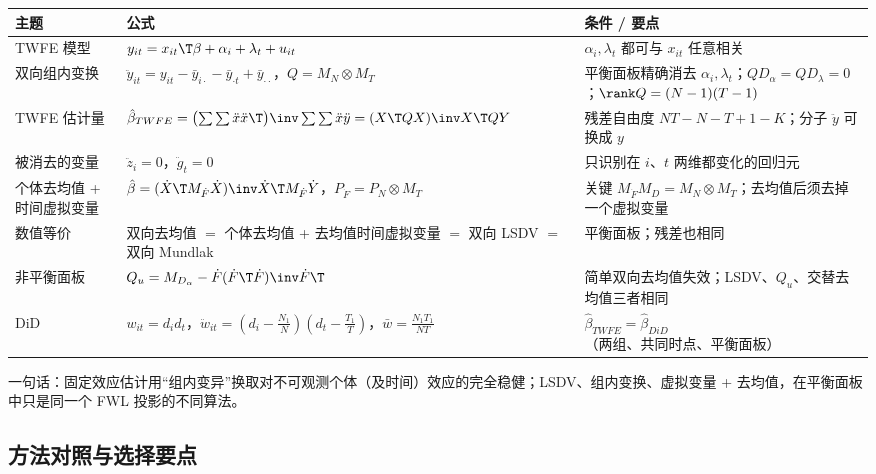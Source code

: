 \begin{center}
\small
\begin{tabularx}{\linewidth}{@{}p{2.3cm}LL@{}}
\toprule
主题 & 公式 & 条件 / 要点\\
\midrule
TWFE 模型 & $y_{it}=x_{it}\T\beta+\alpha_i+\lambda_t+u_{it}$ & $\alpha_i,\lambda_t$ 都可与 $x_{it}$ 任意相关\\
双向组内变换 & $\ddot y_{it}=y_{it}-\bar y_{i\cdot}-\bar y_{\cdot t}+\bar y_{\cdot\cdot}$，$Q=M_N\otimes M_T$ & 平衡面板精确消去 $\alpha_i,\lambda_t$；$QD_\alpha=QD_\lambda=0$；$\rank Q=(N-1)(T-1)$\\
TWFE 估计量 & $\hat\beta_{TWFE}=\bigl(\sum\sum\ddot x\ddot x\T\bigr)\inv\sum\sum\ddot x\ddot y=(X\T QX)\inv X\T QY$ & 残差自由度 $NT-N-T+1-K$；分子 $\ddot y$ 可换成 $y$\\
被消去的变量 & $\ddot z_i=0$，$\ddot g_t=0$ & 只识别在 $i$、$t$ 两维都变化的回归元\\
个体去均值 + 时间虚拟变量 & $\hat\beta=(\dot X\T M_{\dot F}\dot X)\inv\dot X\T M_{\dot F}\dot Y$，$P_{\dot F}=P_N\otimes M_T$ & 关键 $M_{\dot F}M_D=M_N\otimes M_T$；去均值后须去掉一个虚拟变量\\
数值等价 & 双向去均值 $=$ 个体去均值 + 去均值时间虚拟变量 $=$ 双向 LSDV $=$ 双向 Mundlak & 平衡面板；残差也相同\\
非平衡面板 & $Q_u=M_{D_\alpha}-\dot F(\dot F\T\dot F)\inv\dot F\T$ & 简单双向去均值失效；LSDV、$Q_u$、交替去均值三者相同\\
DiD & $w_{it}=d_id_t$，$\ddot w_{it}=(d_i-\frac{N_1}N)(d_t-\frac{T_1}T)$，$\bar w=\frac{N_1T_1}{NT}$ & $\hat\beta_{TWFE}=\hat\beta_{DiD}$（两组、共同时点、平衡面板）\\
\bottomrule
\end{tabularx}
\end{center}

一句话：固定效应估计用“组内变异”换取对不可观测个体（及时间）效应的完全稳健；LSDV、组内变换、虚拟变量 + 去均值，在平衡面板中只是同一个 FWL 投影的不同算法。

\subsection{方法对照与选择要点}

